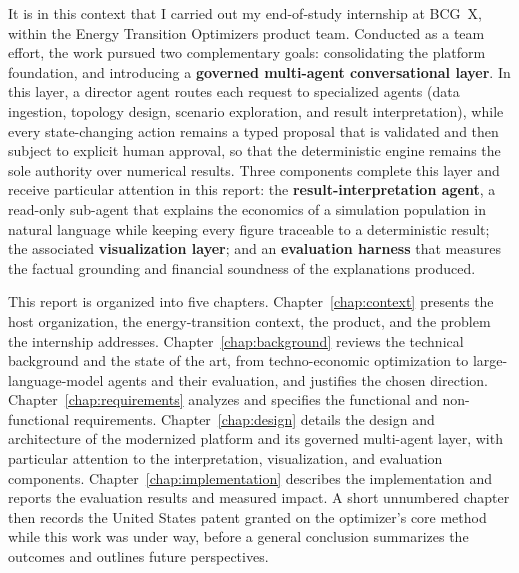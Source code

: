 It is in this context that I carried out my end-of-study internship at BCG~X,
within the Energy Transition Optimizers product team. Conducted as a team
effort, the work pursued two complementary goals: consolidating the platform
foundation, and introducing a \textbf{governed multi-agent conversational
layer}. In this layer, a director agent routes each request to specialized
agents (data ingestion, topology design, scenario exploration, and result
interpretation), while every state-changing action remains a typed proposal that
is validated and then subject to explicit human approval, so that the
deterministic engine remains the sole authority over numerical results. Three
components complete this layer and receive particular attention in this report: the
\textbf{result-interpretation agent}, a read-only sub-agent that explains the
economics of a simulation population in natural language while keeping every
figure traceable to a deterministic result; the associated
\textbf{visualization layer}; and an \textbf{evaluation harness} that measures
the factual grounding and financial soundness of the explanations produced.


This report is organized into five chapters. Chapter~\ref{chap:context} presents
the host organization, the energy-transition context, the product, and the
problem the internship addresses. Chapter~\ref{chap:background} reviews the
technical background and the state
of the art, from techno-economic optimization to large-language-model agents and
their evaluation, and justifies the chosen direction.
Chapter~\ref{chap:requirements} analyzes and
specifies the functional and non-functional requirements.
Chapter~\ref{chap:design} details the
design and architecture of the modernized platform and its governed multi-agent
layer, with particular attention to the interpretation, visualization, and
evaluation components. Chapter~\ref{chap:implementation} describes the
implementation and reports the
evaluation results and measured impact. A short unnumbered chapter then records
the United States patent granted on the optimizer's core method while this work
was under way, before a general conclusion summarizes the
outcomes and outlines future perspectives.


